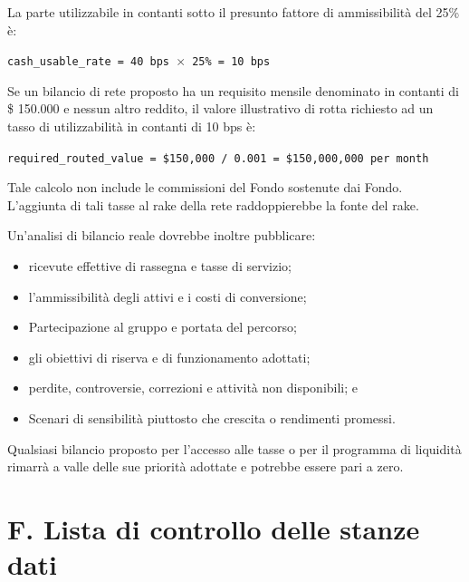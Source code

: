 \documentclass[11pt]{article}
\begin{document}
La parte utilizzabile in contanti sotto il presunto fattore di ammissibilità del 25\% è:

\texttt{cash\_usable\_rate = 40 bps $\times$ 25\% = 10 bps}

Se un bilancio di rete proposto ha un requisito mensile denominato in contanti di \$ 150.000 e nessun altro reddito, il valore illustrativo di rotta richiesto ad un tasso di utilizzabilità in contanti di 10 bps è:

\texttt{required\_routed\_value = \$150,000 / 0.001 = \$150,000,000 per month}

Tale calcolo non include le commissioni del Fondo sostenute dai Fondo. L'aggiunta di tali tasse al rake della rete raddoppierebbe la fonte del rake.

Un'analisi di bilancio reale dovrebbe inoltre pubblicare:

\begin{itemize}[leftmargin=*]
\item ricevute effettive di rassegna e tasse di servizio;
\item l'ammissibilità degli attivi e i costi di conversione;
\item Partecipazione al gruppo e portata del percorso;
\item gli obiettivi di riserva e di funzionamento adottati;
\item perdite, controversie, correzioni e attività non disponibili; e
\item Scenari di sensibilità piuttosto che crescita o rendimenti promessi.
\end{itemize}
Qualsiasi bilancio proposto per l'accesso alle tasse o per il programma di liquidità rimarrà a valle delle sue priorità adottate e potrebbe essere pari a zero.


\section*{F. Lista di controllo delle stanze dati}
\end{document}
